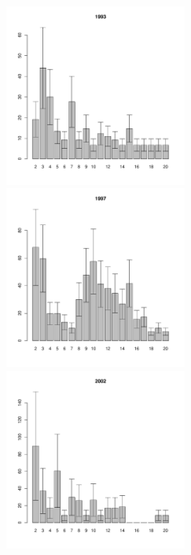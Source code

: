 \documentclass[12pt, a4paper]{article}
\begin{document}
\begin{figure}[h]
\begin{multicols}{3}
\hfill
\includegraphics[width=60mm]{../White_Sea/Luvenga_II_razrez/low_beatch2_1993_.pdf}
\hfill
\includegraphics[width=60mm]{../White_Sea/Luvenga_II_razrez/low_beatch2_1997_.pdf}
\hfill
\includegraphics[width=60mm]{../White_Sea/Luvenga_II_razrez/low_beatch2_2002_.pdf}
\end{multicols}



\end{figure}
\end{document}

